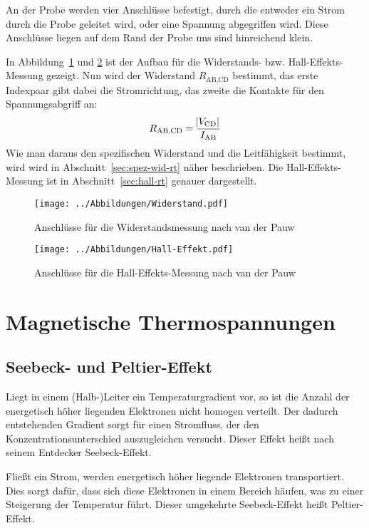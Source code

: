 An der Probe werden vier Anschlüsse befestigt, durch die entweder ein Strom
durch die Probe geleitet wird, oder eine Spannung abgegriffen wird. Diese
Anschlüsse liegen auf dem Rand der Probe uns sind hinreichend klein.

In Abbildung~\ref{fig:vdPauw-wid} und \ref{fig:vdPauw-hall} ist der Aufbau für
die Widerstands- bzw. Hall-Effekts-Messung gezeigt. Nun wird der Widerstand
$R_\text{AB,CD}$ bestimmt, das erste Indexpaar gibt dabei die Stromrichtung,
das zweite die Kontakte für den Spannungsabgriff an:
\[
    R_\text{AB,CD} = \frac{\abs{V_\text{CD}}}{I_\text{AB}}
\]
Wie man daraus den spezifischen Widerstand und die Leitfähigkeit bestimmt, wird
wird in Abschnitt~\ref{sec:spez-wid-rt} näher beschrieben. Die
Hall-Effekts-Messung ist in Abschnitt~\ref{sec:hall-rt} genauer dargestellt.

\begin{figure}
    \centering
    \texttt{[image: ../Abbildungen/Widerstand.pdf]}
    \caption{%
        Anschlüsse für die Widerstandsmessung nach van der Pauw
    }
    \label{fig:vdPauw-wid}
\end{figure}

\begin{figure}
    \centering
    \texttt{[image: ../Abbildungen/Hall-Effekt.pdf]}
    \caption{%
        Anschlüsse für die Hall-Effekts-Messung nach van der Pauw
    }
    \label{fig:vdPauw-hall}
\end{figure}

\section{Magnetische Thermospannungen}

\subsection{Seebeck- und Peltier-Effekt}

Liegt in einem (Halb-)Leiter ein Temperaturgradient vor, so ist die Anzahl der
energetisch höher liegenden Elektronen nicht homogen verteilt. Der dadurch
entstehenden Gradient sorgt für einen Stromfluss, der den
Konzentrationsunterschied auszugleichen versucht. Dieser Effekt heißt nach
seinem Entdecker Seebeck-Effekt.

Fließt ein Strom, werden energetisch höher liegende Elektronen transportiert.
Dies sorgt dafür, dass sich diese Elektronen in einem Bereich häufen, was zu
einer Steigerung der Temperatur führt. Dieser umgekehrte Seebeck-Effekt heißt
Peltier-Effekt.

